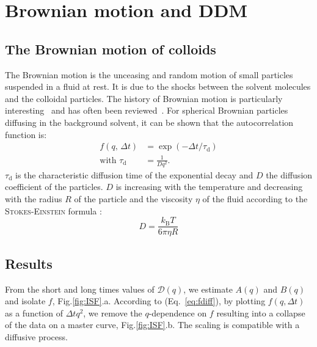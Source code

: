 \documentclass[prb,reprint,amsmath,amssymb]{revtex4-1}
\begin{document}
\section{Brownian motion and DDM}
\label{sec:BrownSection}

\subsection{The Brownian motion of colloids}
The Brownian motion is the unceasing and random motion of small particles suspended in a fluid at rest. It is due to the shocks between the solvent molecules and the colloidal particles. The history of Brownian motion is particularly interesting~\cite{13_brown1828brief,9_einstein1906theory, 14_sutherland1905lxxv, 10_von1906kinetischen,ajp1997lemons,22_perrin2014atomes} and has often been reviewed~\cite{ajp1997lemons, ajp2006newburgh, ajp2006bergstein}. For spherical Brownian particles  diffusing in the  background solvent, it can be shown that the autocorrelation function is\cite{18_sartor2003dynamic, ajp1999goldburg,ajp1969clark,8_berne2000dynamic}:
\begin{align}
f(q, \, \Delta t) &= \exp(-\Delta t/\tau_\text{d})
\label{eq:fdiff}\\
\text{with }\tau_\text{d} &= \frac{1}{Dq^2}.
\label{eq:relax}
\end{align}
$\tau_\text{d}$ is the characteristic diffusion time of the exponential decay and $D$ the diffusion coefficient of the particles. $D$ is increasing with the temperature and decreasing with the radius $R$ of the particle and the viscosity $\eta$ of the fluid according to the \textsc{Stokes-Einstein} formula \cite{Nelson2014, 16_CollSusp, ajp1997lemons, ajp2007jia}:
\begin{equation}
D = \frac{k_\text{B} T}{6 \pi \eta R}
\end{equation}

\subsection{Results}
\label{sec:resultcolloid}


From the short and long times values of $\mathcal{D}(q)$, we estimate $A(q)$ and $B(q)$ and isolate $f$, Fig.\ref{fig:ISF}.a. According to (Eq.~\ref{eq:fdiff}), by plotting $f(q, \Delta t)$ as a function of $\Delta t q^2$, we remove the $q$-dependence on $f$ resulting into a collapse of the data on a master curve, Fig.\ref{fig:ISF}.b. The scaling is compatible with a diffusive process.
\end{document}
